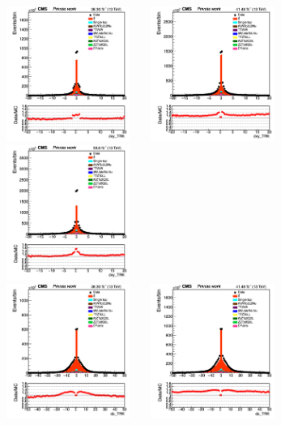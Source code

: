 \documentclass{cernatlasnote}
\begin{document}
  
 \begin{figure}[htp]
\centering
\includegraphics[width=4.6cm, height=4.4cm]{images/emu_channel/2016/16_Range_0pt2_1pt8/track_dxy_TRK_Linear.png}
\includegraphics[width=4.6cm, height=4.4cm]{images/emu_channel/2017/17_Range_0pt2_1pt8/track_dxy_TRK_Linear.png}
 \includegraphics[width=4.6cm, height=4.4cm]{images/emu_channel/2018/18_Range_0pt2_1pt8/track_dxy_TRK_Linear.png}\\
 \includegraphics[width=4.6cm, height=4.4cm]{images/emu_channel/2016/16_Range_0pt2_1pt8/track_dz_TRK_Linear.png}
\includegraphics[width=4.6cm, height=4.4cm]{images/emu_channel/2017/17_Range_0pt2_1pt8/track_dz_TRK_Linear.png}

\end{figure}
\end{document}
